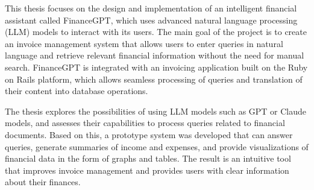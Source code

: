 This thesis focuses on the design and implementation of an intelligent financial
assistant called FinanceGPT, which uses advanced natural language processing (LLM)
models to interact with its users. The main goal of the project is to create an
invoice management system that allows users to enter queries in natural language
and retrieve relevant financial information without the need for manual search. FinanceGPT
is integrated with an invoicing application built on the Ruby on Rails platform,
which allows seamless processing of queries and translation of their content
into database operations.

The thesis explores the possibilities of using LLM models such as GPT or Claude
models, and assesses their capabilities to process queries related to financial documents.
Based on this, a prototype system was developed that can answer queries,
generate summaries of income and expenses, and provide visualizations of financial
data in the form of graphs and tables. The result is an intuitive tool that
improves invoice management and provides users with clear information about
their finances.